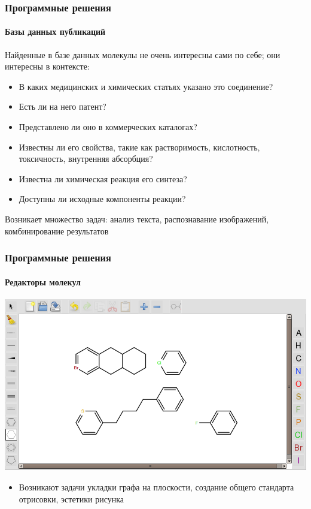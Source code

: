 \begin{frame}
  \frametitle{Программные решения}
  \framesubtitle{Базы данных публикаций}
  Найденные в базе данных молекулы не очень интересны сами по себе; они интересны в контексте:
  \begin{itemize}
    \item В каких медицинских и химических статьях указано это соединение?
    \item Есть ли на него патент?
    \item Представлено ли оно в коммерческих каталогах?
    \item Известны ли его свойства, такие как растворимость, кислотность, токсичность, внутренняя абсорбция?
    \item Известна ли химическая реакция его синтеза?
    \item Доступны ли исходные компоненты реакции?
  \end{itemize}
  \begin{center}Возникает множество задач: анализ текста, распознавание изображений, комбинирование результатов\end{center}
\end{frame}

\begin{frame}
  \frametitle{Программные решения}
  \framesubtitle{Редакторы молекул}

  \begin{center}
    \includegraphics[scale=0.37]{images/sketcher.png}
  \end{center}
  \begin{itemize}
    \item Возникают задачи укладки графа на плоскости, создание общего стандарта отрисовки, эстетики рисунка 
  \end{itemize}

\end{frame}

